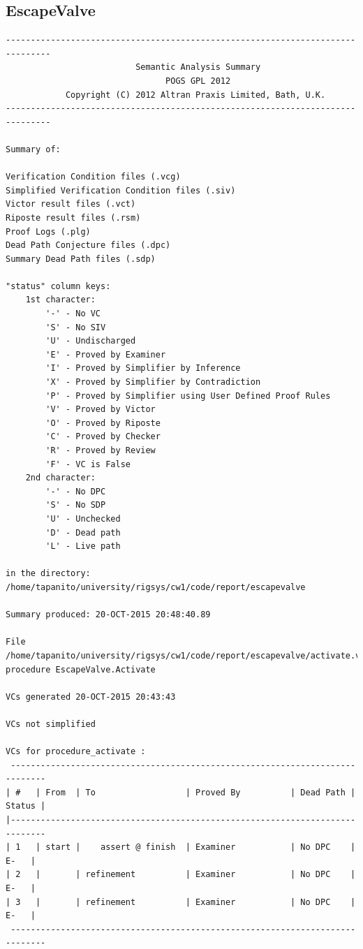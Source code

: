 \documentclass[a4paper, titlepage]{article}
\begin{document}
\subsection{EscapeValve}
{\small
\begin{lstlisting}
-------------------------------------------------------------------------------
                          Semantic Analysis Summary                            
                                POGS GPL 2012                                  
            Copyright (C) 2012 Altran Praxis Limited, Bath, U.K.               
-------------------------------------------------------------------------------

Summary of:

Verification Condition files (.vcg)
Simplified Verification Condition files (.siv)
Victor result files (.vct)
Riposte result files (.rsm)
Proof Logs (.plg)
Dead Path Conjecture files (.dpc)
Summary Dead Path files (.sdp)

"status" column keys:
    1st character:
        '-' - No VC
        'S' - No SIV
        'U' - Undischarged
        'E' - Proved by Examiner
        'I' - Proved by Simplifier by Inference
        'X' - Proved by Simplifier by Contradiction
        'P' - Proved by Simplifier using User Defined Proof Rules
        'V' - Proved by Victor
        'O' - Proved by Riposte
        'C' - Proved by Checker
        'R' - Proved by Review
        'F' - VC is False
    2nd character:
        '-' - No DPC
        'S' - No SDP
        'U' - Unchecked
        'D' - Dead path
        'L' - Live path

in the directory:
/home/tapanito/university/rigsys/cw1/code/report/escapevalve

Summary produced: 20-OCT-2015 20:48:40.89

File /home/tapanito/university/rigsys/cw1/code/report/escapevalve/activate.vcg
procedure EscapeValve.Activate

VCs generated 20-OCT-2015 20:43:43

VCs not simplified

VCs for procedure_activate :
 -----------------------------------------------------------------------------
| #   | From  | To                  | Proved By          | Dead Path | Status |
|-----------------------------------------------------------------------------
| 1   | start |    assert @ finish  | Examiner           | No DPC    |   E-   |
| 2   |       | refinement          | Examiner           | No DPC    |   E-   |
| 3   |       | refinement          | Examiner           | No DPC    |   E-   |
 -----------------------------------------------------------------------------



\end{lstlisting}}
\end{document}
